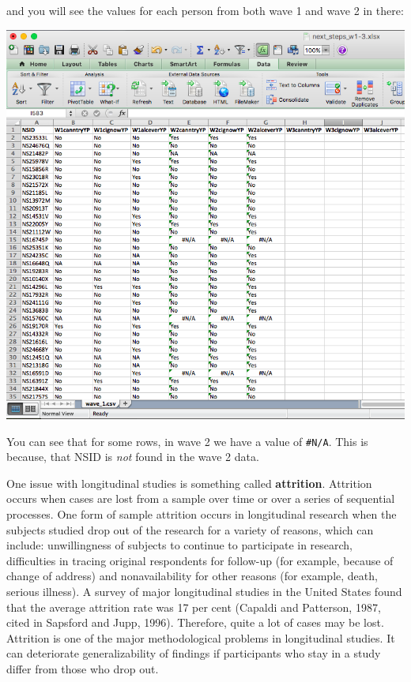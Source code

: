 \documentclass[]{book}
\theoremstyle{definition}
\theoremstyle{definition}
\theoremstyle{definition}
\theoremstyle{remark}
\begin{document}
and you will see the values for each person from both wave 1 and wave 2
in there:

\includegraphics{imgs/nas_present.png}

You can see that for some rows, in wave 2 we have a value of
\texttt{\#N/A}. This is because, that NSID is \emph{not} found in the
wave 2 data.

One issue with longitudinal studies is something called
\textbf{attrition}. Attrition occurs when cases are lost from a sample
over time or over a series of sequential processes. One form of sample
attrition occurs in longitudinal research when the subjects studied drop
out of the research for a variety of reasons, which can include:
unwillingness of subjects to continue to participate in research,
difficulties in tracing original respondents for follow-up (for example,
because of change of address) and nonavailability for other reasons (for
example, death, serious illness). A survey of major longitudinal studies
in the United States found that the average attrition rate was 17 per
cent (Capaldi and Patterson, 1987, cited in Sapsford and Jupp, 1996).
Therefore, quite a lot of cases may be lost. Attrition is one of the
major methodological problems in longitudinal studies. It can
deteriorate generalizability of findings if participants who stay in a
study differ from those who drop out.
\end{document}
